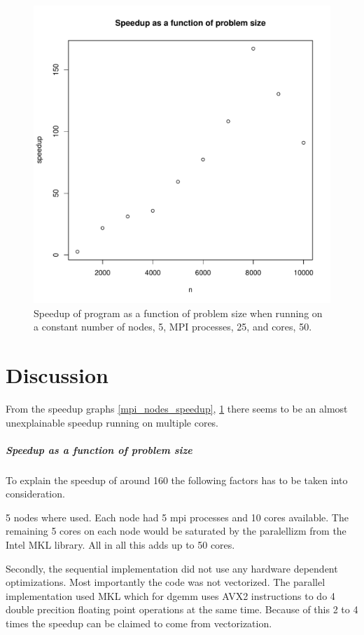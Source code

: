 \documentclass{article}
\begin{document}
\begin{figure}[H]
  \begin{center}
    \includegraphics[width=12cm]{../analysis/problem_size_speedup.pdf}
  \end{center}
  \caption{Speedup of program as a function of problem size when running on a constant number of nodes, 5, MPI processes, 25, and cores, 50.}
  \label{problem_size_speedup}
\end{figure}

\section{Discussion}
From the speedup graphs \ref{mpi_nodes_speedup}, \ref{problem_size_speedup} there seems to be an almost unexplainable speedup running on
multiple cores.
\subparagraph{Speedup as a function of problem size}
To explain the speedup of around 160 the following factors has
to be taken into consideration.

5 nodes where used. Each node had
5 mpi processes and 10 cores available. The remaining 5 cores on each
node would be saturated by the paralellizm from the Intel MKL library.
All in all this adds up to 50 cores.

Secondly, the sequential implementation did not use any hardware dependent
optimizations. Most importantly the code was not vectorized. The parallel
implementation used MKL which for dgemm uses AVX2 instructions to do
4 double precition floating point operations at the same time. Because of
this 2 to 4 times the speedup can be claimed to come from vectorization.
\end{document}
